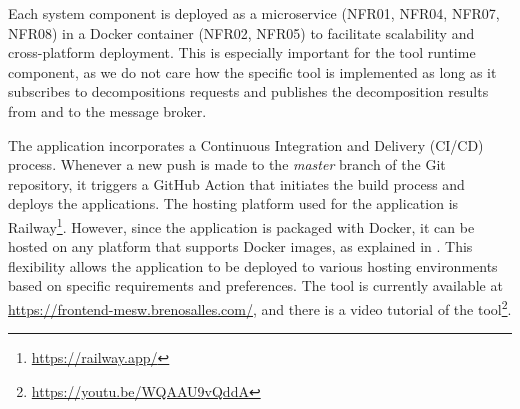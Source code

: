 Each system component is deployed as a microservice (NFR01, NFR04, NFR07,
NFR08) in a Docker container (NFR02, NFR05) to facilitate scalability and
cross-platform deployment. This is especially important for the tool runtime
component, as we do not care how the specific tool is implemented as long as it
subscribes to decompositions requests and publishes the decomposition results
from and to the message broker.

The application incorporates a Continuous Integration and Delivery (CI/CD)
process. Whenever a new push is made to the \textit{master} branch of the Git
repository, it triggers a GitHub Action that initiates the build process and
deploys the applications. The hosting platform used for the application is
Railway\footnote{\url{https://railway.app/}}. However, since the application is
packaged with Docker, it can be hosted on any platform that supports Docker
images, as explained in . This flexibility allows the
application to be deployed to various hosting environments based on specific
requirements and preferences. The tool is currently available at
\url{https://frontend-mesw.brenosalles.com/}, and there is a video tutorial of
the tool\footnote{\url{https://youtu.be/WQAAU9vQddA}}.
